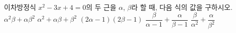 이차방정식 $x^2-3x+4=0$의 두 근을 $\alpha$, $\beta$라 할 때, 다음 식의 값을 구하시오.
 $\alpha^2\beta+\alpha\beta^2$
 $\alpha^2+\alpha\beta+\beta^2$
 $(2\alpha-1)(2\beta-1)$
 $\dfrac{\beta}{\alpha-1}+\dfrac{\alpha}{\beta-1}$
 $\dfrac{\beta}{\alpha^2}+\dfrac{\alpha}{\beta^2}$
